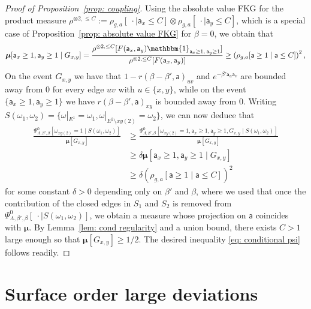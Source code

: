 \documentclass[11pt,a4paper]{article}
\theoremstyle{definition}
\numberwithin{equation}{section}
\begin{document}
\begin{proof}[Proof of Proposition~\textup{\ref{prop: coupling}}]
Using the absolute value FKG for the product measure $\rho^{\otimes 2,\leq C}:=\rho_{g,a}[\:\cdot \mid \mathsf{a}_x\leq C]\otimes \rho_{g,a}[\:\cdot \mid \mathsf{a}_y\leq C]$, which is a special case of Proposition~\ref{prop: absolute value FKG} for $\beta=0$, we obtain that
\begin{equation}\label{eq: cond FKG}
\boldsymbol{\mu}[\mathsf{a}_x \geq 1, \mathsf{a}_y\geq 1 \mid G_{x,y}]=\frac{\rho^{\otimes 2,\leq C}[F(\mathsf{a}_x,\mathsf{a}_y)\mathbbm{1}_{\mathsf{a}_x\geq 1,\:\mathsf{a}_y\geq 1}]}{\rho^{\otimes 2,\leq C}[F(\mathsf{a}_x,\mathsf{a}_y)]}\geq \left(\rho_{g,a}[\mathsf{a} \geq 1 \mid \mathsf{a}\leq C]\right)^2,   
\end{equation}
On the event $G_{x,y}$ we have that $1-r(\beta-\beta',\mathsf{a})_{uv}$ and $e^{-\beta' \mathsf{a}_u \mathsf{a}_v}$ are bounded away from $0$ for every edge $uv$ with $u\in \{x,y\}$, while on the event $\{\mathsf{a}_x\geq 1, \mathsf{a}_y\geq 1\}$ we have $r(\beta-\beta',\mathsf{a})_{xy}$ is bounded away from $0$. Writing $S(\omega_1,\omega_2)=\{\omega|_{E^1}=\omega_1, \omega|_{E^2\setminus xy(2)}=\omega_2\}$, we can now deduce that 
\begin{equation}
\begin{aligned}
\frac{\Psi^0_{\Lambda,\beta',\beta}[\omega_{xy(2)}=1 \mid S(\omega_1,\omega_2)]}{\boldsymbol{\mu}[G_{x,y}]}&\geq
\frac{\Psi^0_{\Lambda,\beta',\beta}[\omega_{xy(2)}=1, \mathsf{a}_x \geq 1, \mathsf{a}_y\geq 1, G_{x,y}\mid S(\omega_1,\omega_2)]}{\boldsymbol{\mu}[G_{x,y}]}\\&\geq
\delta \boldsymbol{\mu}[ \mathsf{a}_x \geq 1, \mathsf{a}_y\geq 1 \mid G_{x,y}] \\
&\geq \delta \left(\rho_{g,a}[\mathsf{a} \geq 1 \mid \mathsf{a}\leq C]\right)^2
\end{aligned}
\end{equation}
for some constant $\delta>0$ depending only on $\beta'$ and $\beta$, where we used that once the contribution of the closed edges in $S_1$ and $S_2$ is removed from $\Psi^0_{\Lambda,\beta',\beta}[\:\cdot \mid S(\omega_1,\omega_2)]$, we obtain a measure whose projection on $\mathsf{a}$ coincides with $\boldsymbol{\mu}$. By Lemma~\ref{lem: cond regularity} and a union bound, there exists $C>1$ large enough so that $\boldsymbol{\mu}[G_{x,y}]\geq 1/2$.
The desired inequality \eqref{eq: conditional psi} follows readily. 
\end{proof}



\section{Surface order large deviations}\label{sec:coarse_graining}
\end{document}

